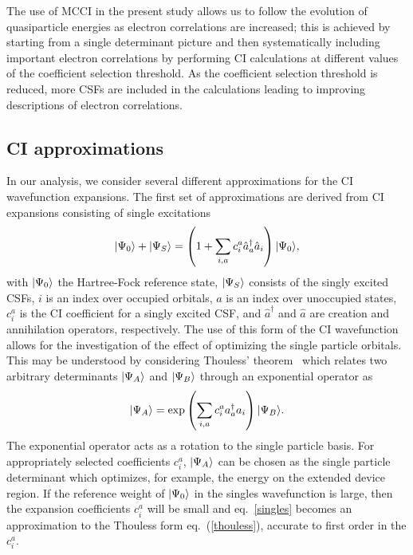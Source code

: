 The use of \ac{MCCI} in the present study allows us to follow the
evolution of quasiparticle energies as electron correlations are
increased; this is achieved by starting from a single determinant picture
and then systematically including important electron correlations by
performing \ac{CI} calculations at different values of the coefficient
selection threshold. As the coefficient selection threshold is reduced,
more \acp{CSF} are included in the calculations leading to improving
descriptions of electron correlations.

\subsection{CI approximations}

In our analysis, we consider several different approximations for the CI
wavefunction expansions. The first set of approximations are derived from
CI expansions consisting of single excitations 
\begin{equation}
\label{singles}
  |\Psi_0 \rangle + |\Psi_{S} \rangle
  =
  \left(1 + \sum_{i,a} c_i^a \hat{a}_a^\dagger \hat{a}_i \right) |\Psi_0 \rangle,
\end{equation} 
with $|\Psi_0 \rangle$ the Hartree-Fock reference state, $|\Psi_{S} \rangle$
consists of the singly excited CSFs, $i$ is an index over occupied
orbitals, $a$ is an index over unoccupied states, $c_i^a$ is the CI
coefficient for a singly excited CSF, and $\hat{a}^\dagger$ and $\hat{a}$
are creation and annihilation operators, respectively. The use of this
form of the CI wavefunction allows for the investigation of the effect
of optimizing the single particle orbitals. This may be understood by
considering Thouless' theorem~\cite{thouless} which relates two arbitrary
determinants $|\Psi_A \rangle$ and $|\Psi_B \rangle$ through  an exponential
operator as
\begin{equation}
\label{thouless}
|\Psi_A \rangle = \exp \left( \sum_{i,a} c_i^a a_a^\dagger a_i \right) |\Psi_B \rangle.
\end{equation}    
The exponential operator acts as a rotation to the single particle basis.
For appropriately selected coefficients $c_i^a$, $|\Psi_A \rangle$ can be
chosen as the single particle determinant which optimizes, for example,
the energy on the extended device region. If the reference weight of
$|\Psi_0 \rangle$ in the singles wavefunction is large, then the expansion
coefficients $c_i^a$ will be small and eq.~\ref{singles} becomes an
approximation to the Thouless form eq.~(\ref{thouless}), accurate to first
order in the $c_i^a$. 

